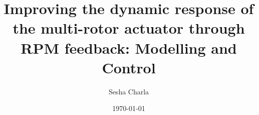 \documentclass[letterpaper, 11pt]{article}
\title{Improving the dynamic response of the multi-rotor actuator through RPM feedback: Modelling and Control}
\author{Sesha Charla}
\date{\today}
\begin{document}
\maketitle
\tableofcontents
\newpage
\
\newpage

\newpage

\newpage

\newpage

\newpage

\newpage


\end{document}

